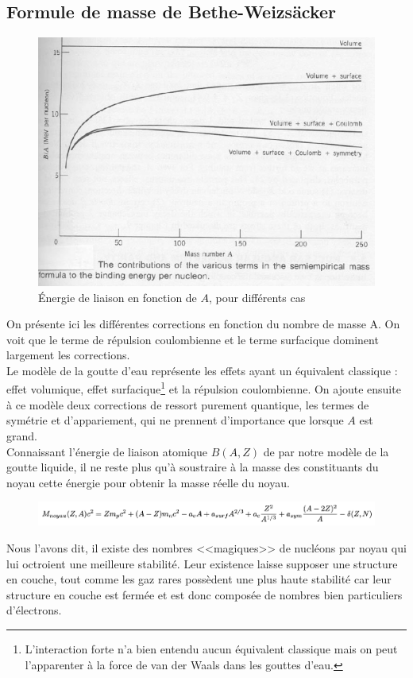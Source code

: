 \subsection{Formule de masse de Bethe-Weizsäcker}


\begin{figure}[ht]
    \centering
    \includegraphics{Images4/correction.PNG}
    \caption{Énergie de liaison en fonction de $A$, pour différents cas}
\end{figure}
On présente ici les différentes corrections en fonction du nombre de masse A. On voit que le terme de répulsion coulombienne et le terme surfacique dominent largement les corrections.\\
Le modèle de la goutte d'eau représente les effets ayant un équivalent classique : effet volumique, effet surfacique\footnote{L'interaction forte n'a bien entendu aucun équivalent classique mais on peut l'apparenter à la force de van der Waals dans les gouttes d'eau.} et la répulsion coulombienne. On ajoute ensuite à ce modèle deux corrections de ressort purement quantique, les termes de symétrie et d'appariement, qui ne prennent d'importance que lorsque $A$ est grand.\\

Connaissant l'énergie de liaison atomique $B(A,Z)$ de par notre modèle de la goutte liquide, il ne reste plus qu'à soustraire à la masse des constituants du noyau cette énergie pour obtenir la masse réelle du noyau.\\

\begin{figure}[ht]
    \centering
    \includegraphics[width=\textwidth] {Images4/Bethe.PNG}
\end{figure}
Nous l'avons dit, il existe des nombres <<magiques>> de nucléons par noyau qui lui octroient une meilleure stabilité. Leur existence laisse supposer une structure en couche, tout comme les gaz rares possèdent une plus haute stabilité car leur structure en couche est fermée et est donc composée de nombres bien particuliers d'électrons.


